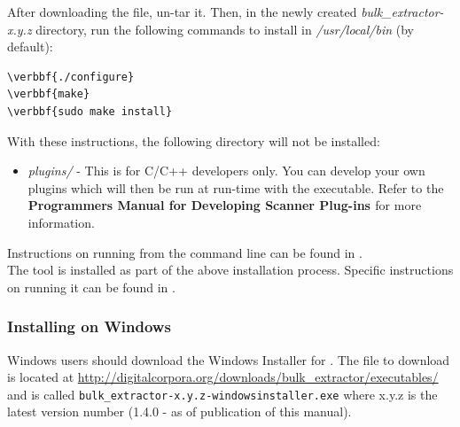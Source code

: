 \documentclass[11pt]{article} %
\begin{document}
After downloading the file, un-tar it. Then, in the newly created \textit{bulk\_extractor-x.y.z} directory, run the following commands to install \bulk in \textit{/usr/local/bin} (by default):

\begin{Verbatim}[commandchars=\\\{\}]
\verbbf{./configure}
\verbbf{make}
\verbbf{sudo make install}
\end{Verbatim}


With these instructions, the following directory will not be installed:
\begin{itemize}
\item{\textit{plugins/} - This is for C/C++ developers only. You can develop your own \bulk plugins which will then be run at run-time with the \bulk executable. Refer to the \textbf{\bulk Programmers Manual for Developing Scanner Plug-ins \cite{programmersmanual}} for more information.}
\end{itemize}
Instructions on running \bulk from the command line can be found in \textbf{}.\\
	
The \viewer tool is installed as part of the above installation process. Specific instructions on running it can be found in \textbf{}.

\subsubsection{Installing on Windows}
\label{InstallOnWindows}
Windows users should download the Windows Installer for \bulk.  The file to download is located at \url{http://digitalcorpora.org/downloads/bulk_extractor/executables/} and is called \texttt{bulk\_extractor-x.y.z-windowsinstaller.exe} where x.y.z is the latest version number (1.4.0 - as of publication of this manual).   \\
\end{document}
